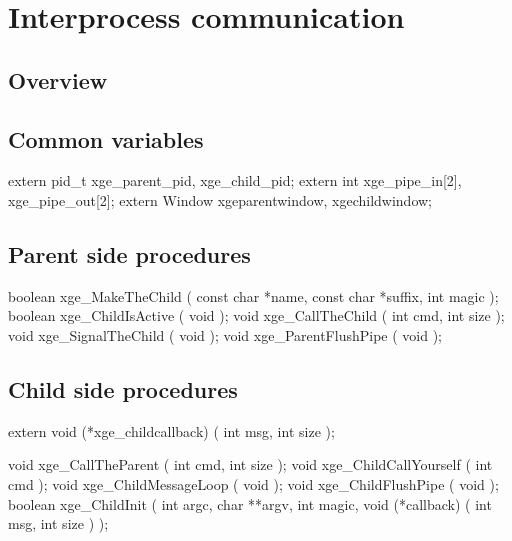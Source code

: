 \section{Interprocess communication}

\subsection{Overview}

\subsection{Common variables}

\begin{listingC}
extern pid_t xge_parent_pid, xge_child_pid;
extern int xge_pipe_in[2], xge_pipe_out[2];
extern Window xgeparentwindow, xgechildwindow;
\end{listingC}


\subsection{Parent side procedures}

\begin{listingC}
boolean xge_MakeTheChild ( const char *name,
                           const char *suffix, int magic );
boolean xge_ChildIsActive ( void );
void xge_CallTheChild ( int cmd, int size );
void xge_SignalTheChild ( void );
void xge_ParentFlushPipe ( void );
\end{listingC}


\subsection{Child side procedures}

\begin{listingC}
extern void (*xge_childcallback) ( int msg, int size );

void xge_CallTheParent ( int cmd, int size );
void xge_ChildCallYourself ( int cmd );
void xge_ChildMessageLoop ( void );
void xge_ChildFlushPipe ( void );
boolean xge_ChildInit ( int argc, char **argv, int magic,
                        void (*callback) ( int msg, int size ) );
\end{listingC}


